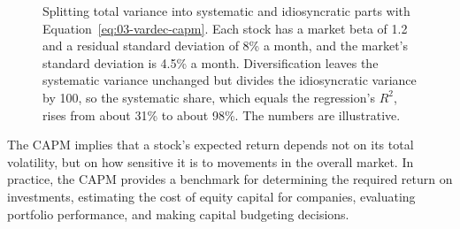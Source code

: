 \begin{figure}[!htbp]
  \centering
  \caption{Splitting total variance into systematic and idiosyncratic parts with Equation~\eqref{eq:03-vardec-capm}. Each stock has a market beta of 1.2 and a residual standard deviation of 8\% a month, and the market's standard deviation is 4.5\% a month. Diversification leaves the systematic variance unchanged but divides the idiosyncratic variance by 100, so the systematic share, which equals the regression's $R^2$, rises from about 31\% to about 98\%. The numbers are illustrative.}
  \label{fig:03-vardec}
\end{figure}

The CAPM implies that a stock's expected return depends not on its total volatility, but on how sensitive it is to movements in the overall market. In practice, the CAPM provides a benchmark for determining the required return on investments, estimating the cost of equity capital for companies, evaluating portfolio performance, and making capital budgeting decisions. 


